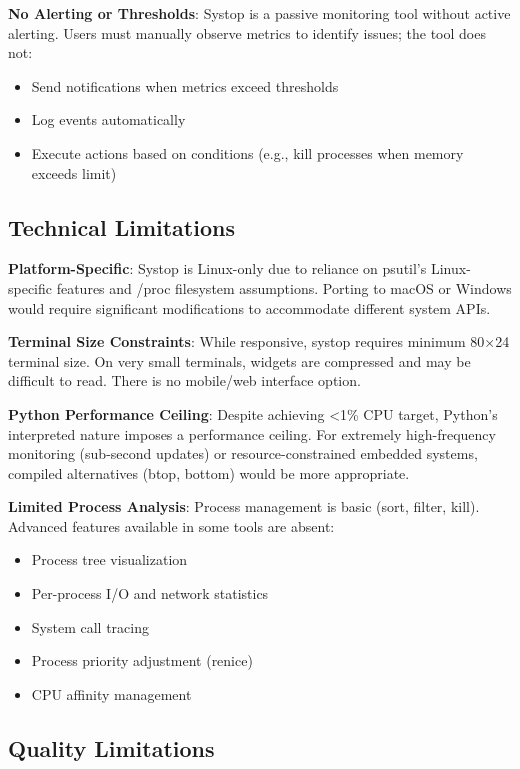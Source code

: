 \documentclass[12pt,a4paper,oneside]{report}
\begin{document}
\textbf{No Alerting or Thresholds}: Systop is a passive monitoring tool without active alerting. Users must manually observe metrics to identify issues; the tool does not:
\begin{itemize}
    \item Send notifications when metrics exceed thresholds
    \item Log events automatically
    \item Execute actions based on conditions (e.g., kill processes when memory exceeds limit)
\end{itemize}

\subsection{Technical Limitations}

\textbf{Platform-Specific}: Systop is Linux-only due to reliance on psutil's Linux-specific features and /proc filesystem assumptions. Porting to macOS or Windows would require significant modifications to accommodate different system APIs.

\textbf{Terminal Size Constraints}: While responsive, systop requires minimum 80×24 terminal size. On very small terminals, widgets are compressed and may be difficult to read. There is no mobile/web interface option.

\textbf{Python Performance Ceiling}: Despite achieving <1\% CPU target, Python's interpreted nature imposes a performance ceiling. For extremely high-frequency monitoring (sub-second updates) or resource-constrained embedded systems, compiled alternatives (btop, bottom) would be more appropriate.

\textbf{Limited Process Analysis}: Process management is basic (sort, filter, kill). Advanced features available in some tools are absent:
\begin{itemize}
    \item Process tree visualization
    \item Per-process I/O and network statistics
    \item System call tracing
    \item Process priority adjustment (renice)
    \item CPU affinity management
\end{itemize}

\subsection{Quality Limitations}
\end{document}
